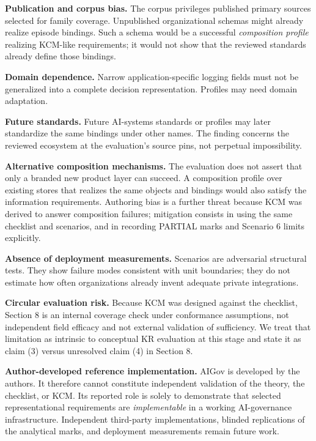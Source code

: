 \documentclass[11pt,a4paper]{article}
\begin{document}
\textbf{Publication and corpus bias.} The corpus privileges published primary sources selected for family coverage. Unpublished organizational schemas might already realize episode bindings. Such a schema would be a successful \emph{composition profile} realizing KCM-like requirements; it would not show that the reviewed standards already define those bindings.


\textbf{Domain dependence.} Narrow application-specific logging fields must not be generalized into a complete decision representation. Profiles may need domain adaptation.


\textbf{Future standards.} Future AI-systems standards or profiles may later standardize the same bindings under other names. The finding concerns the reviewed ecosystem at the evaluation's source pins, not perpetual impossibility.


\textbf{Alternative composition mechanisms.} The evaluation does not assert that only a branded new product layer can succeed. A composition profile over existing stores that realizes the same objects and bindings would also satisfy the information requirements. Authoring bias is a further threat because KCM was derived to answer composition failures; mitigation consists in using the same checklist and scenarios, and in recording PARTIAL marks and Scenario 6 limits explicitly.


\textbf{Absence of deployment measurements.} Scenarios are adversarial structural tests. They show failure modes consistent with unit boundaries; they do not estimate how often organizations already invent adequate private integrations.


\textbf{Circular evaluation risk.} Because KCM was designed against the checklist, Section 8 is an internal coverage check under conformance assumptions, not independent field efficacy and not external validation of sufficiency. We treat that limitation as intrinsic to conceptual KR evaluation at this stage and state it as claim (3) versus unresolved claim (4) in Section 8.


\textbf{Author-developed reference implementation.} AIGov is developed by the authors. It therefore cannot constitute independent validation of the theory, the checklist, or KCM. Its reported role is solely to demonstrate that selected representational requirements are \emph{implementable} in a working AI-governance infrastructure. Independent third-party implementations, blinded replications of the analytical marks, and deployment measurements remain future work.
\end{document}
